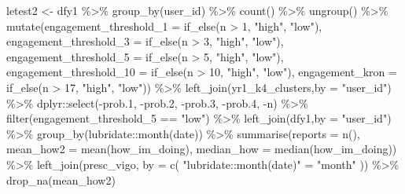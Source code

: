 \documentclass[
]{article}
\newenvironment{Shaded}{\begin{snugshade}}{\end{snugshade}}
\newcommand{\AttributeTok}[1]{\textcolor[rgb]{0.77,0.63,0.00}{#1}}
\newcommand{\DecValTok}[1]{\textcolor[rgb]{0.00,0.00,0.81}{#1}}
\newcommand{\FloatTok}[1]{\textcolor[rgb]{0.00,0.00,0.81}{#1}}
\newcommand{\FunctionTok}[1]{\textcolor[rgb]{0.00,0.00,0.00}{#1}}
\newcommand{\NormalTok}[1]{#1}
\newcommand{\OtherTok}[1]{\textcolor[rgb]{0.56,0.35,0.01}{#1}}
\newcommand{\SpecialCharTok}[1]{\textcolor[rgb]{0.00,0.00,0.00}{#1}}
\newcommand{\StringTok}[1]{\textcolor[rgb]{0.31,0.60,0.02}{#1}}
\begin{document}
\begin{Shaded}
\begin{Highlighting}[]
\NormalTok{ letest2 }\OtherTok{\textless{}{-}}\NormalTok{ dfy1 }\SpecialCharTok{\%\textgreater{}\%}
   \FunctionTok{group\_by}\NormalTok{(user\_id) }\SpecialCharTok{\%\textgreater{}\%}
   \FunctionTok{count}\NormalTok{() }\SpecialCharTok{\%\textgreater{}\%}
   \FunctionTok{ungroup}\NormalTok{() }\SpecialCharTok{\%\textgreater{}\%} 
   \FunctionTok{mutate}\NormalTok{(}\AttributeTok{engagement\_threshold\_1 =} \FunctionTok{if\_else}\NormalTok{(n }\SpecialCharTok{\textgreater{}} \DecValTok{1}\NormalTok{, }\StringTok{"high"}\NormalTok{, }\StringTok{"low"}\NormalTok{),}
          \AttributeTok{engagement\_threshold\_3 =} \FunctionTok{if\_else}\NormalTok{(n }\SpecialCharTok{\textgreater{}} \DecValTok{3}\NormalTok{, }\StringTok{"high"}\NormalTok{, }\StringTok{"low"}\NormalTok{),}
          \AttributeTok{engagement\_threshold\_5 =} \FunctionTok{if\_else}\NormalTok{(n }\SpecialCharTok{\textgreater{}} \DecValTok{5}\NormalTok{, }\StringTok{"high"}\NormalTok{, }\StringTok{"low"}\NormalTok{),}
          \AttributeTok{engagement\_threshold\_10 =} \FunctionTok{if\_else}\NormalTok{(n }\SpecialCharTok{\textgreater{}} \DecValTok{10}\NormalTok{, }\StringTok{"high"}\NormalTok{, }\StringTok{"low"}\NormalTok{),}
          \AttributeTok{engagement\_kron =} \FunctionTok{if\_else}\NormalTok{(n }\SpecialCharTok{\textgreater{}} \DecValTok{17}\NormalTok{, }\StringTok{"high"}\NormalTok{, }\StringTok{"low"}\NormalTok{)) }\SpecialCharTok{\%\textgreater{}\%} 
   \FunctionTok{left\_join}\NormalTok{(yr1\_k4\_clusters,}\AttributeTok{by =} \StringTok{"user\_id"}\NormalTok{) }\SpecialCharTok{\%\textgreater{}\%} 
\NormalTok{   dplyr}\SpecialCharTok{::}\FunctionTok{select}\NormalTok{(}\SpecialCharTok{{-}}\NormalTok{prob}\FloatTok{.1}\NormalTok{,}
                 \SpecialCharTok{{-}}\NormalTok{prob}\FloatTok{.2}\NormalTok{,}
                 \SpecialCharTok{{-}}\NormalTok{prob}\FloatTok{.3}\NormalTok{,}
                 \SpecialCharTok{{-}}\NormalTok{prob}\FloatTok{.4}\NormalTok{,}
                 \SpecialCharTok{{-}}\NormalTok{n) }\SpecialCharTok{\%\textgreater{}\%} 
  \FunctionTok{filter}\NormalTok{(engagement\_threshold\_5 }\SpecialCharTok{==} \StringTok{"low"}\NormalTok{) }\SpecialCharTok{\%\textgreater{}\%}
   \FunctionTok{left\_join}\NormalTok{(dfy1,}\AttributeTok{by =} \StringTok{"user\_id"}\NormalTok{) }\SpecialCharTok{\%\textgreater{}\%}  
   \FunctionTok{group\_by}\NormalTok{(lubridate}\SpecialCharTok{::}\FunctionTok{month}\NormalTok{(date)) }\SpecialCharTok{\%\textgreater{}\%}
   \FunctionTok{summarise}\NormalTok{(}\AttributeTok{reports =} \FunctionTok{n}\NormalTok{(),}
             \AttributeTok{mean\_how2 =} \FunctionTok{mean}\NormalTok{(how\_im\_doing),}
             \AttributeTok{median\_how =} \FunctionTok{median}\NormalTok{(how\_im\_doing)) }\SpecialCharTok{\%\textgreater{}\%}
   \FunctionTok{left\_join}\NormalTok{(presc\_vigo, }\AttributeTok{by =} \FunctionTok{c}\NormalTok{( }\StringTok{"lubridate::month(date)"} \OtherTok{=} \StringTok{"month"}\NormalTok{ )) }\SpecialCharTok{\%\textgreater{}\%} 
   \FunctionTok{drop\_na}\NormalTok{(mean\_how2)  }
 


\end{Highlighting}
\end{Shaded}
\end{document}
